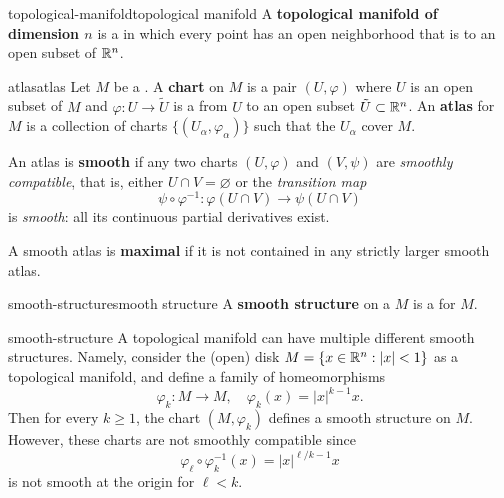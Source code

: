 \begin{topic}{topological-manifold}{topological manifold}
    A \textbf{topological manifold of dimension $n$} is a    in which every point has an open neighborhood that is  to an open subset of $\mathbb{R}^n$.
\end{topic}

\begin{topic}{atlas}{atlas}
    Let $M$ be a . A \textbf{chart} on $M$ is a pair $(U, \varphi)$ where $U$ is an open subset of $M$ and $\varphi \colon U \to \tilde{U}$ is a  from $U$ to an open subset $\tilde{U} \subset \mathbb{R}^n$. An \textbf{atlas} for $M$ is a collection of charts $\{ (U_\alpha, \varphi_\alpha) \}$ such that the $U_\alpha$ cover $M$.
    
    An atlas is \textbf{smooth} if any two charts $(U, \varphi)$ and $(V, \psi)$ are \textit{smoothly compatible}, that is, either $U \cap V = \varnothing$ or the \textit{transition map}
    \[ \psi \circ \varphi^{-1} \colon \varphi(U \cap V) \to \psi(U \cap V) \]
    is \textit{smooth}: all its continuous partial derivatives exist.
    
    A smooth atlas is \textbf{maximal} if it is not contained in any strictly larger smooth atlas.
\end{topic}

\begin{topic}{smooth-structure}{smooth structure}
    A \textbf{smooth structure} on a  $M$ is a  for $M$.
\end{topic}

\begin{example}{smooth-structure}
    A topological manifold can have multiple different smooth structures. Namely, consider the (open) disk $M = \{ x \in \mathbb{R}^n : |x| < 1 \}$ as a topological manifold, and define a family of homeomorphisms
    \[ \varphi_k \colon M \to M, \quad \varphi_k(x) = |x|^{k - 1} x . \]
    Then for every $k \ge 1$, the chart $(M, \varphi_k)$ defines a smooth structure on $M$. However, these charts are not smoothly compatible since
    \[ \varphi_\ell \circ \varphi_k^{-1} (x) = |x|^{\ell/k - 1} x \]
    is not smooth at the origin for $\ell < k$.
\end{example}

